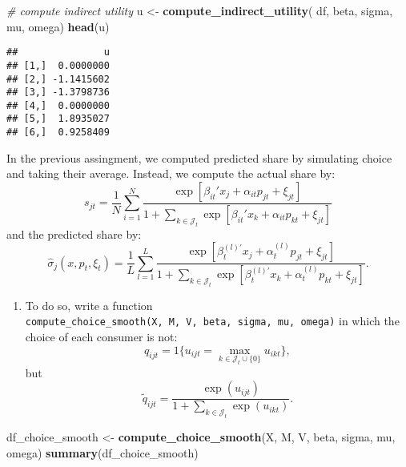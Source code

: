 \documentclass[
]{book}
\newenvironment{Shaded}{\begin{snugshade}}{\end{snugshade}}
\newcommand{\CommentTok}[1]{\textcolor[rgb]{0.56,0.35,0.01}{\textit{#1}}}
\newcommand{\KeywordTok}[1]{\textcolor[rgb]{0.13,0.29,0.53}{\textbf{#1}}}
\newcommand{\NormalTok}[1]{#1}
\newcommand{\StringTok}[1]{\textcolor[rgb]{0.31,0.60,0.02}{#1}}
\providecommand{\tightlist}{%
  \setlength{\itemsep}{0pt}\setlength{\parskip}{0pt}}
\begin{document}
\begin{Shaded}
\begin{Highlighting}[]
\CommentTok{# compute indirect utility}
\NormalTok{u <-}\StringTok{ }
\StringTok{  }\KeywordTok{compute_indirect_utility}\NormalTok{(}
\NormalTok{    df, beta, sigma, }
\NormalTok{           mu, omega)}
\KeywordTok{head}\NormalTok{(u)}
\end{Highlighting}
\end{Shaded}

\begin{verbatim}
##               u
## [1,]  0.0000000
## [2,] -1.1415602
## [3,] -1.3798736
## [4,]  0.0000000
## [5,]  1.8935027
## [6,]  0.9258409
\end{verbatim}

In the previous assingment, we computed predicted share by simulating choice and taking their average. Instead, we compute the actual share by:
\[
s_{jt} = \frac{1}{N} \sum_{i = 1}^N \frac{\exp[\beta_{it}' x_j + \alpha_{it} p_{jt} + \xi_{jt}]}{1 + \sum_{k \in \mathcal{J}_t} \exp[\beta_{it}' x_k + \alpha_{it} p_{kt} + \xi_{jt}]}
\]
and the predicted share by:
\[
\widehat{\sigma}_{j}(x, p_t, \xi_t) = \frac{1}{L} \sum_{l = 1}^L \frac{\exp[\beta_{t}^{(l)\prime} x_j + \alpha_{t}^{(l)} p_{jt} + \xi_{jt}]}{1 + \sum_{k \in \mathcal{J}_t} \exp[\beta_{t}^{(l)\prime} x_k + \alpha_{t}^{(l)} p_{kt} + \xi_{jt}]}.
\]

\begin{enumerate}
\def\labelenumi{\arabic{enumi}.}
\setcounter{enumi}{7}
\tightlist
\item
  To do so, write a function \texttt{compute\_choice\_smooth(X,\ M,\ V,\ beta,\ sigma,\ mu,\ omega)} in which the choice of each consumer is not:
  \[
  q_{ijt} = 1\{u_{ijt} = \max_{k \in \mathcal{J}_t \cup \{0\}} u_{ikt}\},
  \]
  but
  \[
  \tilde{q}_{ijt} = \frac{\exp(u_{ijt})}{1 + \sum_{k \in \mathcal{J}_t} \exp(u_{ikt})}.
  \]
\end{enumerate}

\begin{Shaded}
\begin{Highlighting}[]
\NormalTok{df_choice_smooth <-}
\StringTok{  }\KeywordTok{compute_choice_smooth}\NormalTok{(X, M, V, beta, sigma, mu, omega)}
\KeywordTok{summary}\NormalTok{(df_choice_smooth)}
\end{Highlighting}
\end{Shaded}
\end{document}
